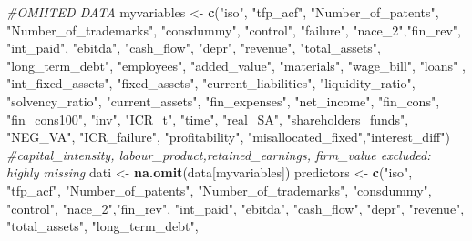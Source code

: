 \documentclass[]{article}
\newenvironment{Shaded}{\begin{snugshade}}{\end{snugshade}}
\newcommand{\CommentTok}[1]{\textcolor[rgb]{0.56,0.35,0.01}{\textit{#1}}}
\newcommand{\KeywordTok}[1]{\textcolor[rgb]{0.13,0.29,0.53}{\textbf{#1}}}
\newcommand{\NormalTok}[1]{#1}
\newcommand{\StringTok}[1]{\textcolor[rgb]{0.31,0.60,0.02}{#1}}
\begin{document}
\begin{Shaded}
\begin{Highlighting}[]
\CommentTok{#OMIITED DATA}
\NormalTok{myvariables <-}\StringTok{ }\KeywordTok{c}\NormalTok{(}\StringTok{"iso"}\NormalTok{, }\StringTok{"tfp_acf"}\NormalTok{,  }\StringTok{"Number_of_patents"}\NormalTok{, }\StringTok{"Number_of_trademarks"}\NormalTok{,}
                 \StringTok{"consdummy"}\NormalTok{, }\StringTok{"control"}\NormalTok{, }\StringTok{"failure"}\NormalTok{, }\StringTok{"nace_2"}\NormalTok{,}\StringTok{"fin_rev"}\NormalTok{, }\StringTok{"int_paid"}\NormalTok{,}
                 \StringTok{"ebitda"}\NormalTok{, }\StringTok{"cash_flow"}\NormalTok{, }\StringTok{"depr"}\NormalTok{, }\StringTok{"revenue"}\NormalTok{, }\StringTok{"total_assets"}\NormalTok{, }
                 \StringTok{"long_term_debt"}\NormalTok{, }\StringTok{"employees"}\NormalTok{, }\StringTok{"added_value"}\NormalTok{, }\StringTok{"materials"}\NormalTok{, }\StringTok{"wage_bill"}\NormalTok{,}
                 \StringTok{"loans"}\NormalTok{ , }\StringTok{"int_fixed_assets"}\NormalTok{, }\StringTok{"fixed_assets"}\NormalTok{, }\StringTok{"current_liabilities"}\NormalTok{,}
                 \StringTok{"liquidity_ratio"}\NormalTok{,  }\StringTok{"solvency_ratio"}\NormalTok{, }\StringTok{"current_assets"}\NormalTok{, }\StringTok{"fin_expenses"}\NormalTok{,}
                 \StringTok{"net_income"}\NormalTok{, }\StringTok{"fin_cons"}\NormalTok{, }\StringTok{"fin_cons100"}\NormalTok{, }\StringTok{"inv"}\NormalTok{,  }\StringTok{"ICR_t"}\NormalTok{, }\StringTok{"time"}\NormalTok{,}
                 \StringTok{"real_SA"}\NormalTok{, }\StringTok{"shareholders_funds"}\NormalTok{, }\StringTok{"NEG_VA"}\NormalTok{, }\StringTok{"ICR_failure"}\NormalTok{, }\StringTok{"profitability"}\NormalTok{,}
                 \StringTok{"misallocated_fixed"}\NormalTok{,}\StringTok{"interest_diff"}\NormalTok{)}
\CommentTok{#capital_intensity, labour_product,retained_earnings, firm_value excluded: highly missing}
\NormalTok{dati <-}\StringTok{ }\KeywordTok{na.omit}\NormalTok{(data[myvariables])}
\NormalTok{predictors <-}\StringTok{ }\KeywordTok{c}\NormalTok{(}\StringTok{"iso"}\NormalTok{, }\StringTok{"tfp_acf"}\NormalTok{,  }\StringTok{"Number_of_patents"}\NormalTok{, }\StringTok{"Number_of_trademarks"}\NormalTok{,}
                \StringTok{"consdummy"}\NormalTok{, }\StringTok{"control"}\NormalTok{, }\StringTok{"nace_2"}\NormalTok{,}\StringTok{"fin_rev"}\NormalTok{, }\StringTok{"int_paid"}\NormalTok{, }\StringTok{"ebitda"}\NormalTok{,}
                \StringTok{"cash_flow"}\NormalTok{, }\StringTok{"depr"}\NormalTok{, }\StringTok{"revenue"}\NormalTok{, }\StringTok{"total_assets"}\NormalTok{, }\StringTok{"long_term_debt"}\NormalTok{,}

\end{Highlighting}
\end{Shaded}
\end{document}
